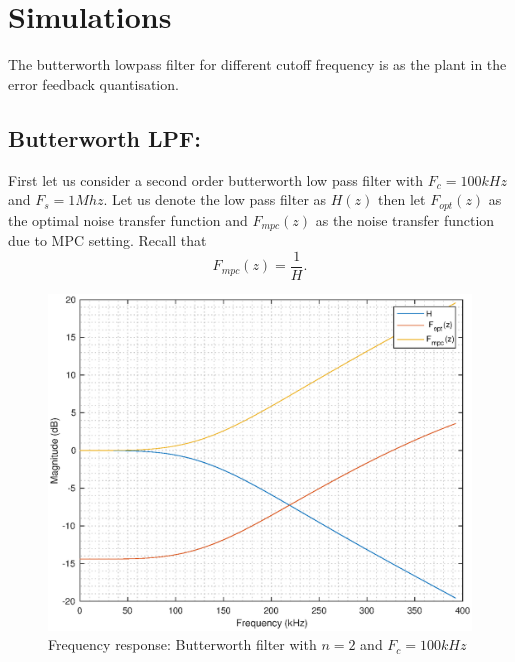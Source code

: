 \documentclass[a4paper]{article}
\begin{document}
\section{Simulations}
The butterworth lowpass filter for different cutoff frequency is as the plant in the error feedback quantisation. 
\subsection*{Butterworth LPF:}
First let us consider a second order butterworth low pass filter with $F_c = 100 \mathit{kHz}$  and $F_s = 1 \mathit{Mhz}$. Let us denote the low pass filter as $H(z)$ then let $F_{opt}(z)$ as the optimal noise transfer function and $F_{mpc}(z)$ as the noise transfer function due to MPC setting. Recall that 
\begin{equation}
	F_{mpc}(z) = \frac{1}{H}.
\end{equation}  
\begin{figure}[!h]
	\centering
	\includegraphics[scale = 1]{mat_plots/butter_2_100khz_1Mhz.eps}	
	\caption{Frequency response: Butterworth filter with $n = 2$ and $F_{c} = 100\mathit{kHz}$}
\end{figure}
\newpage

 
\end{document}
